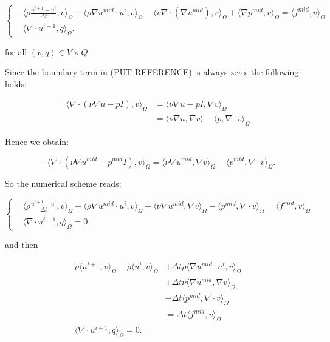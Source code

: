 \documentclass[11pt,a4paper,titlepage]{report}
\begin{document}
\[
\left\{  
\begin{aligned}
& \langle \rho \frac{u^{i+1} - u^i}{\Delta t},v \rangle_\Omega
+ \langle \rho \nabla u^{mid} \cdot u^i  ,v \rangle_\Omega
- \langle v \nabla \cdot (\nabla u^{mid}) ,v \rangle_\Omega
+ \langle \nabla p^{mid} ,v \rangle_\Omega = \langle f^{mid} ,v \rangle_\Omega \\
& \langle \nabla \cdot u^{i+1},q \rangle_\Omega.
\end{aligned}
\right.
\]

for all $(v,q) \in V \times Q$.

Since the boundary term in (PUT REFERENCE) is always zero, the following holds:

\[
\begin{aligned}
\langle \nabla \cdot (\nu \nabla u - pI) ,v \rangle_\Omega & = \langle \nu \nabla u - pI ,\nabla v \rangle_\Omega \\
														& = \langle \nu \nabla u  ,\nabla v \rangle  - \langle p ,\nabla \cdot v \rangle_\Omega										
\end{aligned}
\]

Hence we obtain:

\[
- \langle \nabla \cdot (\nu \nabla u^{mid} - p^{mid}I) ,v \rangle_{\Omega} = \langle \nu \nabla u^{mid}, \nabla v \rangle_\Omega -  \langle p^{mid}, \nabla \cdot v \rangle_\Omega.
\]

So the numerical scheme reads:

\[
\left\{  
\begin{aligned}
& \langle \rho \frac{u^{i+1} - u^i}{\Delta t},v \rangle_\Omega
+ \langle \rho \nabla u^{mid} \cdot u^i  ,v \rangle_\Omega
+ \langle \nu \nabla u^{mid}, \nabla v \rangle_\Omega
- \langle p^{mid} , \nabla \cdot v \rangle_\Omega = \langle f^{mid} ,v \rangle_\Omega \\
& \langle \nabla \cdot u^{i+1},q \rangle_\Omega =  0.
\end{aligned}
\right.
\]

and then

\[
\begin{aligned}
\rho \langle u^{i+1},v \rangle_\Omega - \rho \langle u^i, v \rangle_\Omega & + \Delta t \rho \langle \nabla u^{mid} \cdot u^i  ,v \rangle_\Omega \\
& + \Delta t \nu \langle \nabla u^{mid}, \nabla v \rangle_\Omega \\
& - \Delta t \langle p^{mid} , \nabla \cdot v \rangle_\Omega \\
& = \Delta t \langle f^{mid} ,v \rangle_\Omega \\
\langle \nabla \cdot u^{i+1},q \rangle_\Omega  = 0.
\end{aligned}
\]
\end{document}
